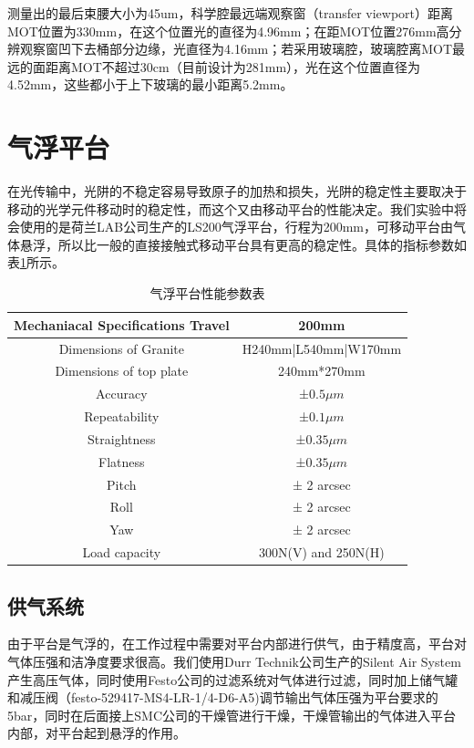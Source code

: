 \documentclass[onecolumn,a4paper,10pt]{article}
\begin{document}
{\color{blue}测量出的最后束腰大小为45um，科学腔最远端观察窗（transfer viewport）距离MOT位置为330mm，在这个位置光的直径为4.96mm；在距MOT位置276mm高分辨观察窗凹下去桶部分边缘，光直径为4.16mm；若采用玻璃腔，玻璃腔离MOT最远的面距离MOT不超过30cm（目前设计为281mm），光在这个位置直径为4.52mm，这些都小于上下玻璃的最小距离5.2mm。}

\section{气浮平台}

在光传输中，光阱的不稳定容易导致原子的加热和损失，光阱的稳定性主要取决于移动的光学元件移动时的稳定性，而这个又由移动平台的性能决定。我们实验中将会使用的是荷兰LAB公司生产的LS200气浮平台，行程为200mm，可移动平台由气体悬浮，所以比一般的直接接触式移动平台具有更高的稳定性。具体的指标参数如表\ref{tab1}所示。
\begin{table}[htbp]
\centering
\label{tab1}
\begin{tabular}{|c|c|}
\hline
Mechaniacal Specifications Travel&200mm\\
\hline
Dimensions of Granite & H240mm|L540mm|W170mm \\
\hline
Dimensions of top plate & 240mm*270mm \\
\hline
Accuracy & ±$0.5 \mu m$\\
\hline
Repeatability & ±$0.1 \mu m$\\
\hline
Straightness &±$0.35 \mu m$\\
\hline
Flatness&±$0.35 \mu m$\\
\hline
Pitch&± 2 arcsec \\
\hline
Roll&± 2 arcsec \\
\hline
Yaw &± 2 arcsec \\
\hline
Load capacity& 300N(V) and 250N(H)\\
\hline

\end{tabular}
\caption{气浮平台性能参数表}
\end{table}

\subsection{供气系统}
由于平台是气浮的，在工作过程中需要对平台内部进行供气，由于精度高，平台对气体压强和洁净度要求很高。我们使用Durr Technik公司生产的Silent Air System产生高压气体，同时使用Festo公司的过滤系统对气体进行过滤，同时加上储气罐和减压阀（festo-529417-MS4-LR-1/4-D6-A5)调节输出气体压强为平台要求的5bar，同时在后面接上SMC公司的干燥管进行干燥，干燥管输出的气体进入平台内部，对平台起到悬浮的作用。
\end{document}
